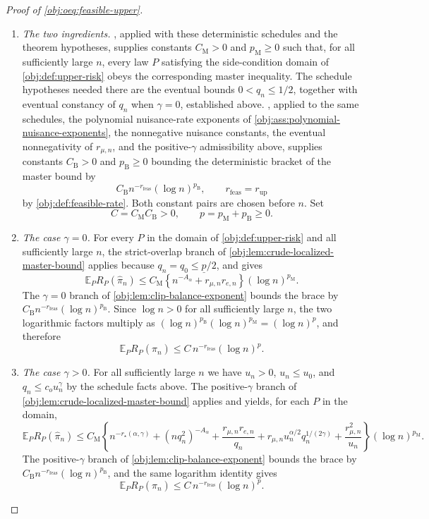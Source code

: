 \documentclass[11pt]{article}
\begin{document}
\begin{proof}[Proof of \cref{obj:oeq:feasible-upper}]
\begin{enumerate}
\item \emph{The two ingredients.}  , applied with these deterministic schedules and the theorem hypotheses, supplies constants \(C_{\mathrm M}>0\) and \(p_{\mathrm M}\ge0\) such that, for all sufficiently large \(n\), every law \(P\) satisfying the side-condition domain of \cref{obj:def:upper-risk} obeys the corresponding master inequality.  The schedule hypotheses needed there are the eventual bounds \(0<q_n\le1/2\), together with eventual constancy of \(q_n\) when \(\gamma=0\), established above.  , applied to the same schedules, the polynomial nuisance-rate exponents of \cref{obj:ass:polynomial-nuisance-exponents}, the nonnegative nuisance constants, the eventual nonnegativity of \(r_{\mu,n}\), and the positive-\(\gamma\) admissibility above, supplies constants \(C_{\mathrm B}>0\) and \(p_{\mathrm B}\ge0\) bounding the deterministic bracket of the master bound by
\[
C_{\mathrm B}n^{-r_{\mathrm{feas}}}(\log n)^{p_{\mathrm B}},
\qquad
r_{\mathrm{feas}}=r_{\mathrm{up}}
\]
by \cref{obj:def:feasible-rate}.  Both constant pairs are chosen before \(n\).  Set
\[
C=C_{\mathrm M}C_{\mathrm B}>0,
\qquad
p=p_{\mathrm M}+p_{\mathrm B}\ge0 .
\]

\item \emph{The case \(\gamma=0\).}  For every \(P\) in the domain of \cref{obj:def:upper-risk} and all sufficiently large \(n\), the strict-overlap branch of \cref{obj:lem:crude-localized-master-bound} applies because \(q_n=q_0\le\underline p/2\), and gives
\[
\mathbb E_P R_P(\widehat\pi_n)
\le
C_{\mathrm M}\left\{n^{-A_\alpha}+r_{\mu,n}r_{e,n}\right\}(\log n)^{p_{\mathrm M}} .
\]
The \(\gamma=0\) branch of \cref{obj:lem:clip-balance-exponent} bounds the brace by \(C_{\mathrm B}n^{-r_{\mathrm{feas}}}(\log n)^{p_{\mathrm B}}\).  Since \(\log n>0\) for all sufficiently large \(n\), the two logarithmic factors multiply as \((\log n)^{p_{\mathrm B}}(\log n)^{p_{\mathrm M}}=(\log n)^{p}\), and therefore
\[
\mathbb E_P R_P(\widehat\pi_n)
\le
C\,n^{-r_{\mathrm{feas}}}(\log n)^{p} .
\]

\item \emph{The case \(\gamma>0\).}  For all sufficiently large \(n\) we have \(u_n>0\), \(u_n\le u_0\), and \(q_n\le c_ou_n^\gamma\) by the schedule facts above.  The positive-\(\gamma\) branch of \cref{obj:lem:crude-localized-master-bound} applies and yields, for each \(P\) in the domain,
\[
\mathbb E_P R_P(\widehat\pi_n)
\le
C_{\mathrm M}
\left\{
n^{-r_\star(\alpha,\gamma)}
+(nq_n^2)^{-A_\alpha}
+\frac{r_{\mu,n}r_{e,n}}{q_n}
+r_{\mu,n}u_n^{\alpha/2}q_n^{1/(2\gamma)}
+\frac{r_{\mu,n}^2}{u_n}
\right\}
(\log n)^{p_{\mathrm M}} .
\]
The positive-\(\gamma\) branch of \cref{obj:lem:clip-balance-exponent} bounds the brace by \(C_{\mathrm B}n^{-r_{\mathrm{feas}}}(\log n)^{p_{\mathrm B}}\), and the same logarithm identity gives
\[
\mathbb E_P R_P(\widehat\pi_n)
\le
C\,n^{-r_{\mathrm{feas}}}(\log n)^{p} .
\]


\end{enumerate}
\end{proof}
\end{document}
